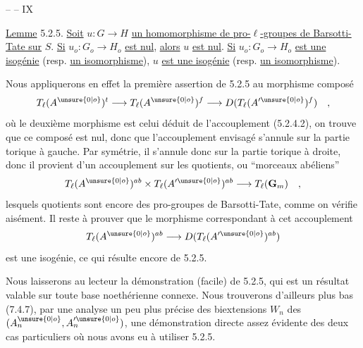 \hfill --  -- \hfill IX

\uline{Lemme} 5.2.5. \uline{Soit} $u:G\longrightarrow H$ \uline{un homomorphisme de pro-$\ell$-groupes de Barsotti-Tate sur} $S$. \uline{Si} $u_o:G_o\longrightarrow H_o$ \uline{est nul}, \uline{alors} $u$ \uline{est nul}. \uline{Si} $u_o:G_o\longrightarrow H_o$ \uline{est une isogénie} (resp. \uline{un isomorphisme}), $u$ \uline{est une isogénie} (resp. \uline{un isomorphisme}).

Nous appliquerons en effet la première assertion de 5.2.5 au morphisme composé
\[
T_\ell(A^{\unsure{0|o}})^t\longrightarrow T_\ell(A^{\unsure{0|o}})^f\longrightarrow D(T_\ell(A'^{\unsure{0|o}})^f)\quad ,
\]
où le deuxième morphisme est celui déduit de l'accouplement (5.2.4.2), on trouve que ce composé est nul, donc que l'accouplement envisagé s'annule sur la partie torique à gauche. Par symétrie, il s'annule donc sur la partie torique à droite, donc il provient d'un accouplement sur les quotients, ou ``morceaux abéliens''
\[
T_\ell(A^{\unsure{0|o}})^{ab}\times T_\ell(A'^{\unsure{0|o}})^{ab}\longrightarrow T_\ell(\mathbf G_m)\quad ,
\]
lesquels quotients sont encore des pro-groupes de Barsotti-Tate, comme on vérifie aisément. Il reste à prouver que le morphisme correspondant à cet accouplement
\[
T_\ell(A^{\unsure{0|o}})^{ab}\longrightarrow D(T_\ell(A'^{\unsure{0|o}})^{ab})
\]
est une isogénie, ce qui résulte encore de 5.2.5.

Nous laisserons au lecteur la démonstration (facile) de 5.2.5, qui est un résultat valable sur toute base noethérienne connexe. Nous trouverons d'ailleurs plus bas (7.4.7), par une analyse un peu plus précise des biextensions $W_n$ des $(A_n^{\unsure{0|o}},A_n'^{\unsure{0|o}})$, une démonstration directe assez évidente des deux cas particuliers où nous avons eu à utiliser 5.2.5.
